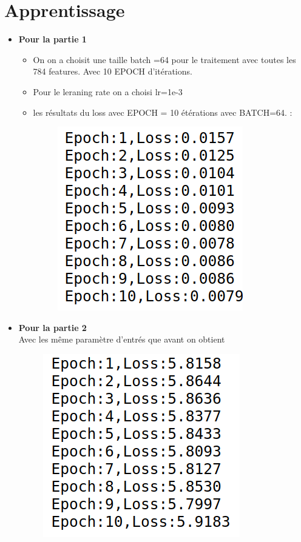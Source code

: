 \documentclass[12pt,a4paper]{report}
\begin{document}
\section{Apprentissage }
\begin{itemize}[label=\textbullet, font=\LARGE \color{blue}]
\item \textbf{ Pour la partie 1 }
\begin{itemize}
\item On on a choisit  une taille  batch =64  pour le traitement avec toutes les 784 features. Avec 10 EPOCH d'itérations.
\item Pour le leraning rate on a choisi lr=1e-3
\item les résultats du loss avec EPOCH = 10 étérations avec BATCH=64. :

\begin{figure}[!h]
   \includegraphics[scale=0.6]{training.png}
\end{figure}

\end{itemize}


\item \textbf{ Pour la partie 2 }\\
Avec les même paramètre d'entrés que avant on obtient 

\begin{figure}[!h]
   \includegraphics[scale=0.6]{training1.png}
\end{figure}



\end{itemize}
\end{document}
